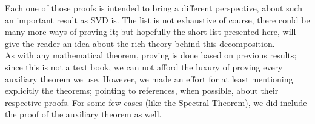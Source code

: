 Each one of those proofs is intended to bring a
different perspective, about such an important result as SVD is. The
list is not exhaustive of course, there could be many more ways of 
proving it; but hopefully the short list presented here, will give the
reader an idea about the rich theory behind this decomposition. \\

As with any mathematical theorem, proving is done based on previous
results; since this is not a text book, we can not afford the luxury
of proving every auxiliary theorem we use. However, we made an effort
for at least mentioning explicitly the theorems; pointing to
references, when possible, about their respective proofs. For some few
cases (like the Spectral Theorem), we did include the proof of the
auxiliary theorem as well.




